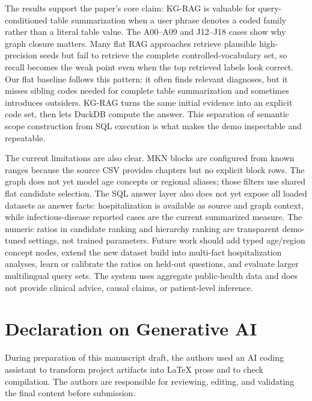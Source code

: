 \documentclass[
]{ceurart}
\begin{document}
The results support the paper's core claim: KG-RAG is valuable for
query-conditioned table summarization when a user phrase denotes a coded
family rather than a literal table value. The A00--A09 and J12--J18 cases show
why graph closure matters. Many flat RAG approaches retrieve plausible
high-precision seeds but fail to retrieve the complete controlled-vocabulary
set, so recall becomes the weak point even when the top retrieved labels look
correct. Our flat baseline follows this pattern: it often finds relevant
diagnoses, but it misses sibling codes needed for complete table
summarization and sometimes introduces outsiders. KG-RAG turns the same
initial evidence into an explicit code set, then lets DuckDB compute the
answer. This separation of semantic scope construction from SQL execution is
what makes the demo inspectable and repeatable.

The current limitations are also clear. MKN blocks are configured from known
ranges because the source CSV provides chapters but no explicit block rows.
The graph does not yet model age concepts or regional aliases; those filters
use shared flat candidate selection. The SQL answer layer also does not yet
expose all loaded datasets as answer facts: hospitalization is available as
source and graph context, while infectious-disease reported cases are the
current summarized measure. The numeric ratios in candidate ranking and
hierarchy ranking are transparent demo-tuned settings, not trained
parameters. Future work should add typed age/region concept nodes, extend the
new dataset build into multi-fact hospitalization analyses, learn or calibrate
the ratios on held-out questions, and evaluate larger multilingual query
sets. The system uses aggregate public-health data and does not provide
clinical advice, causal claims, or patient-level inference.

\section*{Declaration on Generative AI}
During preparation of this manuscript draft, the authors used an AI coding
assistant to transform project artifacts into \LaTeX{} prose and to check
compilation. The authors are responsible for reviewing, editing, and
validating the final content before submission.


\end{document}
